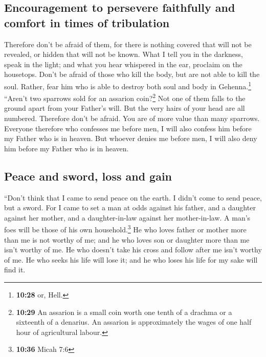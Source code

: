 \hypertarget{encouragement-to-persevere-faithfully-and-comfort-in-times-of-tribulation}{%
\subsection{Encouragement to persevere faithfully and comfort in times
of
tribulation}\label{encouragement-to-persevere-faithfully-and-comfort-in-times-of-tribulation}}

 Therefore don't be afraid of them, for there is nothing
covered that will not be revealed, or hidden that will not be known.
 What I tell you in the darkness, speak in the light; and
what you hear whispered in the ear, proclaim on the housetops.
 Don't be afraid of those who kill the body, but are not
able to kill the soul. Rather, fear him who is able to destroy both soul
and body in Gehenna.\footnote{\textbf{10:28} or, Hell.} 
``Aren't two sparrows sold for an assarion coin?\footnote{\textbf{10:29}
  An assarion is a small coin worth one tenth of a drachma or a
  sixteenth of a denarius. An assarion is approximately the wages of one
  half hour of agricultural labour.} Not one of them falls to the ground
apart from your Father's will.  But the very hairs of
your head are all numbered.  Therefore don't be afraid.
You are of more value than many sparrows.  Everyone
therefore who confesses me before men, I will also confess him before my
Father who is in heaven.  But whoever denies me before
men, I will also deny him before my Father who is in heaven.

\hypertarget{peace-and-sword-loss-and-gain}{%
\subsection{Peace and sword, loss and
gain}\label{peace-and-sword-loss-and-gain}}

 ``Don't think that I came to send peace on the earth. I
didn't come to send peace, but a sword.  For I came to
set a man at odds against his father, and a daughter against her mother,
and a daughter-in-law against her mother-in-law.  A man's
foes will be those of his own household.\footnote{\textbf{10:36} Micah
  7:6}  He who loves father or mother more than me is not
worthy of me; and he who loves son or daughter more than me isn't worthy
of me.  He who doesn't take his cross and follow after me
isn't worthy of me.  He who seeks his life will lose it;
and he who loses his life for my sake will find it.


